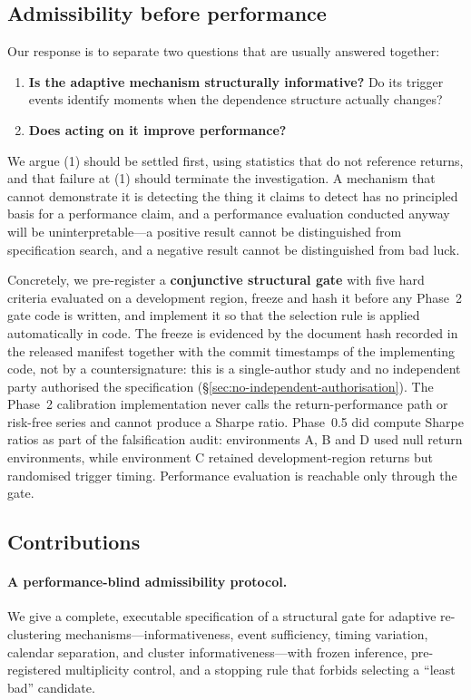 \documentclass[12pt,letterpaper]{article}
\begin{document}
\subsection{Admissibility before performance}

Our response is to separate two questions that are usually answered together:
\begin{enumerate}
\item \textbf{Is the adaptive mechanism structurally informative?} Do its trigger
      events identify moments when the dependence structure actually changes?
\item \textbf{Does acting on it improve performance?}
\end{enumerate}

We argue (1) should be settled first, using statistics that do not reference
returns, and that failure at (1) should terminate the investigation. A mechanism
that cannot demonstrate it is detecting the thing it claims to detect has no
principled basis for a performance claim, and a performance evaluation conducted
anyway will be uninterpretable---a positive result cannot be distinguished from
specification search, and a negative result cannot be distinguished from bad luck.

Concretely, we pre-register a \textbf{conjunctive structural gate} with five hard
criteria evaluated on a development region, freeze and hash it before any Phase~2
gate code is written, and implement it so that the selection rule is applied
automatically in code. The freeze is evidenced by the document hash recorded in the
released manifest together with the commit timestamps of the implementing code, not
by a countersignature: this is a single-author study and no independent party
authorised the specification (\S\ref{sec:no-independent-authorisation}). The Phase~2
calibration implementation never calls the return-performance path or risk-free
series and cannot produce a Sharpe ratio. Phase~0.5 did compute Sharpe ratios as part
of the falsification audit: environments A, B and D used null return environments,
while environment C retained development-region returns but randomised trigger
timing. Performance evaluation is reachable only through the gate.

\subsection{Contributions}

\paragraph{A performance-blind admissibility protocol.} We give a complete,
executable specification of a structural gate for adaptive re-clustering
mechanisms---informativeness, event sufficiency, timing variation, calendar
separation, and cluster informativeness---with frozen inference, pre-registered
multiplicity control, and a stopping rule that forbids selecting a ``least bad''
candidate.
\end{document}
